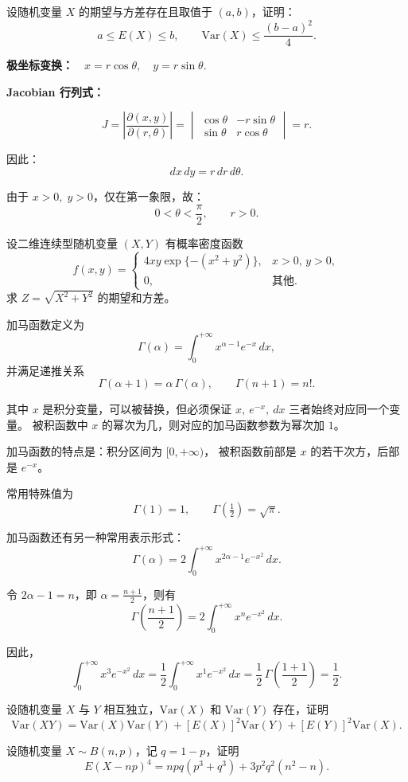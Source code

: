 \begin{homework}[3.16]
设随机变量 $X$ 的期望与方差存在且取值于 $(a,b)$，证明：
\[
a\le E(X)\le b,\qquad 
\mathrm{Var}(X)\le \frac{(b-a)^2}{4}.
\]
\end{homework}
\begin{dxtips}
 \textbf{极坐标变换：}$\quad 
x = r\cos\theta,\quad y = r\sin\theta.$

\textbf{Jacobian 行列式：}

\[
J = \left| \frac{\partial(x,y)}{\partial(r,\theta)} \right|
= \begin{vmatrix}
\cos\theta & -r\sin\theta \\
\sin\theta & r\cos\theta
\end{vmatrix}
= r.
\]

因此：
\[
dx\,dy = r\,dr\,d\theta.
\]

由于 \(x>0,\; y>0\)，仅在第一象限，故：
\[
0 < \theta < \frac{\pi}{2},\qquad r > 0.
\] 
\end{dxtips}
\begin{homework}[3.22]
设二维连续型随机变量 $(X,Y)$ 有概率密度函数
\[
f(x,y)=
\begin{cases}
4xy\exp\{-(x^2+y^2)\}, & x>0,\,y>0,\\[4pt]
0, & \text{其他}.
\end{cases}
\]
求 $Z=\sqrt{X^2+Y^2}$ 的期望和方差。
\end{homework}
\begin{definition}[加马函数]
加马函数定义为
\[
\Gamma(\alpha)=\int_{0}^{+\infty} x^{\alpha-1}e^{-x}\,dx,
\]
并满足递推关系
\[
\Gamma(\alpha+1)=\alpha\,\Gamma(\alpha),\qquad 
\Gamma(n+1)=n!.
\]

其中 $x$ 是积分变量，可以被替换，但必须保证
$x,\ e^{-x},\ dx$ 三者始终对应同一个变量。
被积函数中 $x$ 的幂次为几，则对应的加马函数参数为幂次加 $1$。

\medskip
加马函数的特点是：积分区间为 $[0,+\infty)$，
被积函数前部是 $x$ 的若干次方，后部是 $e^{-x}$。

常用特殊值为
\[
\Gamma(1)=1,\qquad \Gamma\!\left(\tfrac12\right)=\sqrt{\pi}.
\]

\medskip
加马函数还有另一种常用表示形式：
\[
\Gamma(\alpha)=2\int_{0}^{+\infty} x^{2\alpha-1}e^{-x^2}\,dx.
\]

令 $2\alpha-1=n$，即 $\alpha=\frac{n+1}{2}$，则有
\[
\Gamma\!\left(\frac{n+1}{2}\right)
=2\int_{0}^{+\infty} x^{n}e^{-x^2}\,dx.
\]

因此，
\[
\int_{0}^{+\infty} x^{3}e^{-x^2}\,dx
=\frac12\int_{0}^{+\infty} x^{1}e^{-x^2}\,dx
=\frac12\,\Gamma\!\left(\frac{1+1}{2}\right)
=\frac12.
\]
\end{definition}
\begin{homework}[3.23]
设随机变量 $X$ 与 $Y$ 相互独立，$\mathrm{Var}(X)$ 和 $\mathrm{Var}(Y)$ 存在，证明
\[
\mathrm{Var}(XY)
=\mathrm{Var}(X)\mathrm{Var}(Y)
+[E(X)]^2\mathrm{Var}(Y)
+[E(Y)]^2\mathrm{Var}(X).
\]
\end{homework}
\begin{homework}[3.24]
设随机变量 $X\sim B(n,p)$，记 $q=1-p$，证明
\[
E(X-np)^4
=npq(p^3+q^3)+3p^2q^2(n^2-n).
\]
\end{homework}
